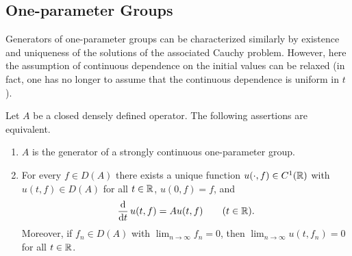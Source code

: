 \subsection{One-parameter Groups} \label{subsec:a2-1.se2}%
%
Generators of one-parameter groups can be characterized similarly by existence and uniqueness of the solutions of the associated Cauchy problem.
However, here the assumption of continuous dependence on the initial values can be relaxed (in fact, one has no longer to assume that the continuous dependence is uniform in $t$).
\begin{theorem}\label{thm:a2-1.6}
Let $A$ be a closed densely defined operator.
The following assertions are equivalent.
\begin{enumerate}[\upshape (a)]
\item \label{thm:a2-1.6.1}
$A$ is the generator of a strongly continuous one-parameter group.
\item \label{thm:a2-1.6.2}
For every $f \in D(A)$ there exists a unique function
$u(\cdot,f) \in C^{1}(\mathbb{R})$ with $u(t,f) \in D(A)$ for all $t \in \mathbb{R}$,
$u(0,f) = f$, and
\[
    \frac{\mathop{}\!\mathrm{d}{}}{\mathop{}\!\mathrm{d}{t}}\,u(t,f) = Au(t,f) \qquad (t \in \mathbb{R}).
\]
Moreover, if\/ $f_n \in D(A)$ with $\lim_{n \to \infty} f_n = 0$,
then $\lim_{n \to \infty} u(t,f_n) = 0$ for all $t \in \mathbb{R}$.
\end{enumerate}
\end{theorem}
